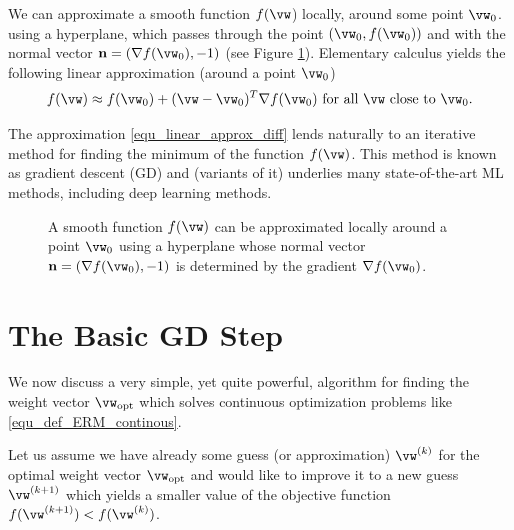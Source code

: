 \documentclass[12pt]{report}
\begin{document}
We can approximate a smooth function $f(\vw$) locally, around some point $\vw_{0}$. 
using a hyperplane, which passes through the point $(\vw_{0},f(\vw_{0}))$ and 
with the normal vector $\mathbf{n} = (\nabla f(\vw_{0}),-1)$ (see Figure \ref{fig_smooth_function}). 
Elementary calculus yields the following linear approximation (around a point $\vw_{0}$) 
\cite{RudinBookPrinciplesMatheAnalysis}
\begin{equation} 
\label{equ_linear_approx_diff}
f(\vw) \approx f(\vw_{0}) + (\vw-\vw_{0})^{T} \nabla f(\vw_{0}) \mbox{ for  all }\vw \mbox{ close to } \vw_{0}.
\end{equation}  

The approximation \eqref{equ_linear_approx_diff} lends naturally to an 
iterative method for finding the minimum of the function $f(\vw)$. This 
method is known as gradient descent (GD) and (variants of it) underlies 
many state-of-the-art ML methods, including deep learning methods. 

\begin{figure}[htbp]
\begin{center}
\end{center}
\caption{A smooth function $f(\vw)$ can be approximated locally around 
	a point $\vw_{0}$ using a hyperplane whose normal vector 
	$\mathbf{n} = (\nabla f(\vw_{0}),-1)$ is determined by the 
	gradient $\nabla f(\vw_{0})$.}
\label{fig_smooth_function}
\end{figure}



\section{The Basic GD Step}
\label{sec_basic_GD_iteration}

We now discuss a very simple, yet quite powerful, algorithm for 
finding the weight vector $\vw_{\rm opt}$ which solves continuous 
optimization problems like \eqref{equ_def_ERM_continous}. 

Let us assume we have already some guess (or approximation) 
$\vw^{(k)}$ for the optimal weight vector $\vw_{\rm opt}$ and 
would like to improve it to a new guess $\vw^{(k+1)}$ which yields 
a smaller value of the objective function $f(\vw^{(k+1)}) < f(\vw^{(k)})$. 
\end{document}
